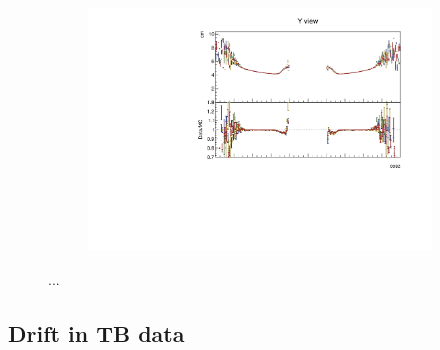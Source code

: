 \documentclass[12pt,a4paper]{article}
\begin{document}
\begin{figure}[!ht]
\begin{subfigure}{0.5\textwidth}
  \end{subfigure}
  \begin{subfigure}{0.5\textwidth}
    \includegraphics[width=\linewidth]{PlotsAngularDistribution/cm_cosz_y.pdf}
  \end{subfigure}
  \caption{...}
  \label{figAbsCalibCosZ2}
\end{figure}

\subsection{Drift in TB data}
\end{document}
